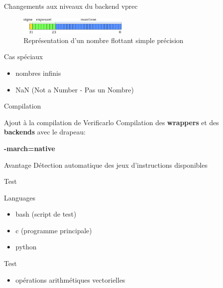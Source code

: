 \documentclass{beamer}
\begin{document}
\begin{frame}{Changements aux niveaux du backend vprec}

  \begin{figure}
    \centering
    \includegraphics[width=200px]{../ressources/IEEE754_simple_precision.png}
    \caption{\label{fig:ieee_simple_precision}Représentation d'un nombre flottant simple précision}
  \end{figure}

  \begin{block}{Cas spéciaux}
    \begin{itemize}
    \item nombres infinis
    \item NaN (Not a Number - Pas un Nombre)
    \end{itemize}
  \end{block}

\end{frame}

\begin{frame}{Compilation}

  \begin{block}{Ajout à la compilation de Verificarlo}
    Compilation des \textbf{wrappers} et des \textbf{backends} avec le drapeau:
    \begin{center}
      \textbf{-march=native}
    \end{center}
  \end{block}

  \begin{block}{Avantage}
    Détection automatique des jeux d'instructions disponibles
  \end{block}


\end{frame}

\begin{frame}{Test}

  \begin{block}{Languages}
    \begin{itemize}
    \item bash (script de test)
    \item c (programme principale)
    \item python
    \end{itemize}
  \end{block}

  \begin{block}{Test}
    \begin{itemize}
    \item opérations arithmétiques vectorielles
    \end{itemize}
  \end{block}

\end{frame}
\end{document}
